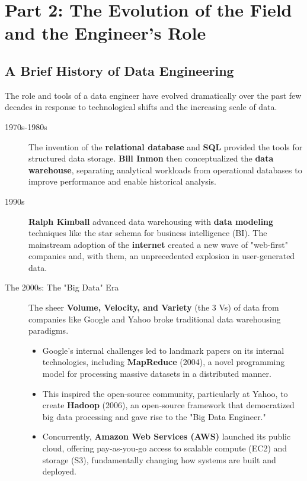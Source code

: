 \documentclass{article}
\begin{document}
\newpage

\section{Part 2: The Evolution of the Field and the Engineer's Role}

\subsection{A Brief History of Data Engineering}
The role and tools of a data engineer have evolved dramatically over the past few decades in response to technological shifts and the increasing scale of data.
\begin{description}
    \item[1970s-1980s] The invention of the \textbf{relational database} and \textbf{SQL} provided the tools for structured data storage. \textbf{Bill Inmon} then conceptualized the \textbf{data warehouse}, separating analytical workloads from operational databases to improve performance and enable historical analysis.
    \item[1990s] \textbf{Ralph Kimball} advanced data warehousing with \textbf{data modeling} techniques like the star schema for business intelligence (BI). The mainstream adoption of the \textbf{internet} created a new wave of "web-first" companies and, with them, an unprecedented explosion in user-generated data.
    \item[The 2000s: The "Big Data" Era] The sheer \textbf{Volume, Velocity, and Variety} (the 3 Vs) of data from companies like Google and Yahoo broke traditional data warehousing paradigms.
    \begin{itemize}
        \item Google's internal challenges led to landmark papers on its internal technologies, including \textbf{MapReduce} (2004), a novel programming model for processing massive datasets in a distributed manner.
        \item This inspired the open-source community, particularly at Yahoo, to create \textbf{Hadoop} (2006), an open-source framework that democratized big data processing and gave rise to the "Big Data Engineer."
        \item Concurrently, \textbf{Amazon Web Services (AWS)} launched its public cloud, offering pay-as-you-go access to scalable compute (EC2) and storage (S3), fundamentally changing how systems are built and deployed.

\end{itemize}
\end{description}
\end{document}
